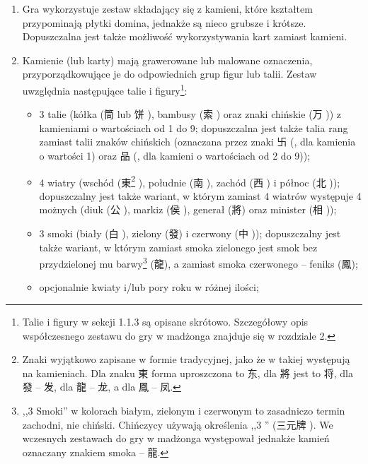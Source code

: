\begin{enumerate}[label={\alph*)}] \item Gra wykorzystuje zestaw składający się
z kamieni, które kształtem przypominają płytki domina, jednakże są nieco grubsze
i krótsze. Dopuszczalna jest także możliwość wykorzystywania kart zamiast
kamieni.
\item Kamienie (lub karty) mają grawerowane lub malowane oznaczenia,
przyporządkowujące je do odpowiednich grup figur lub talii. Zestaw uwzględnia
następujące talie i figury\footnote{Talie i figury w sekcji 1.1.3 są opisane
skrótowo. Szczegółowy opis współczesnego zestawu do gry w madżonga znajduje się
w rozdziale 2.}:
	\begin{itemize}
	  \item 3 talie (kółka (筒  lub 饼 ), bambusy (索
	  ) oraz znaki chińskie (万 )) z kamieniami o
wartościach od 1 do 9; dopuszczalna jest także talia rang zamiast talii znaków
chińskich (oznaczana przez znaki 卐 (, dla kamienia o wartości 1)
oraz 品 (, dla kamieni o wartościach od 2 do 9)); \item 4 wiatry
(wschód (東\footnote{\label{definicja_tradycyjne}Znaki wyjątkowo zapisane w formie
tradycyjnej, jako że w takiej występują na kamieniach. Dla znaku 東 forma
uproszczona to 东, dla 將 jest to 将, dla 發 -- 发, dla 龍 -- 龙, a dla 鳳 -- 凤.}
), południe (南 ), zachód (西 ) i północ (北 )); dopuszczalny jest także
wariant, w którym zamiast 4 wiatrów występuje 4 możnych (diuk (公 ),
markiz (侯 ), generał (將\footnotemark[2] ) oraz minister (相
));
	  \item 3 smoki (biały (白 ), zielony (發\footnotemark[2]
	  ) i czerwony (中 )); dopuszczalny jest także wariant,
	  w którym zamiast smoka zielonego jest smok bez przydzielonej mu
	  barwy\footnote{,,3 Smoki'' w kolorach białym, zielonym i czerwonym to
	  zasadniczo termin zachodni, nie chiński.
	  Chińczycy używają określenia ,,3 '' (三元牌 ). We wczesnych zestawach do gry w madżonga występował jednakże
	  kamień oznaczany znakiem smoka -- 龍\footnotemark[2].} (龍\footnotemark[2]
	  ), a zamiast smoka czerwonego -- feniks (鳳\footnotemark[2] );
	  \item opcjonalnie kwiaty i/lub pory roku w różnej ilości;

\end{itemize}
\end{enumerate}
